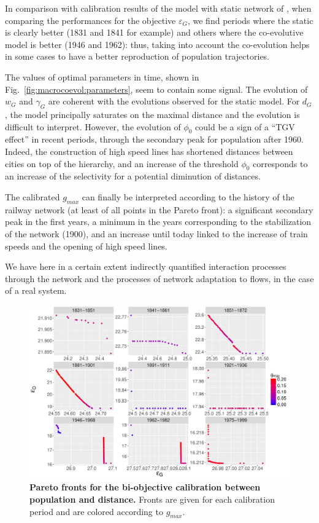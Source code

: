 \documentclass[11pt]{article}
\begin{document}
In comparison with calibration results of the model with static network of \cite{raimbault2018indirect}, when comparing the performances for the objective $\varepsilon_G$, we find periods where the static is clearly better (1831 and 1841 for example) and others where the co-evolutive model is better (1946 and 1962): thus, taking into account the co-evolution helps in some cases to have a better reproduction of population trajectories.


The values of optimal parameters in time, shown in Fig.~\ref{fig:macrocoevol:parameters}, seem to contain some signal. The evolution of $w_G$ and $\gamma_G$ are coherent with the evolutions observed for the static model. For $d_G$, the model principally saturates on the maximal distance and the evolution is difficult to interpret. However, the evolution of $\phi_0$ could be a sign of a ``TGV effect'' in recent periods, through the secondary peak for population after 1960. Indeed, the construction of high speed lines has shortened distances between cities on top of the hierarchy, and an increase of the threshold $\phi_0$ corresponds to an increase of the selectivity for a potential diminution of distances.


The calibrated $g_{max}$ can finally be interpreted according to the history of the railway network (at least of all points in the Pareto front): a significant secondary peak in the first years, a minimum in the years corresponding to the stabilization of the network (1900), and an increase until today linked to the increase of train speeds and the opening of high speed lines. 


We have here in a certain extent indirectly quantified interaction processes through the network and the processes of network adaptation to flows, in the case of a real system.


\begin{figure}
	\includegraphics[width=\linewidth]{figures/6-2-3-fig-macrocoevol-pareto.jpg}
	\caption[Pareto fronts for the calibration on population and distance]{\textbf{Pareto fronts for the bi-objective calibration between population and distance.} Fronts are given for each calibration period and are colored according to $g_{max}$.\label{fig:macrocoevol:pareto}}
\end{figure}
\end{document}
